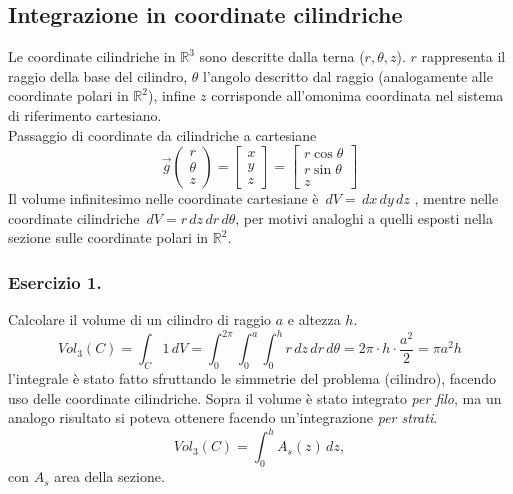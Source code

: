 \documentclass[10pt]{article}
\theoremstyle{plain}
\theoremstyle{definition}
\begin{document}
\subsection{Integrazione in coordinate cilindriche}

Le coordinate cilindriche in $\mathbb{R}^3$ sono descritte dalla terna ($r,\theta,z$). $r$ rappresenta il raggio della base del cilindro, $\theta$ l'angolo descritto dal raggio (analogamente alle coordinate polari in $\mathbb{R}^2$), infine $z$ corrisponde all'omonima coordinata nel sistema di riferimento cartesiano.\\
Passaggio di coordinate da cilindriche a cartesiane
$$\vec{g} \left(\begin{matrix}  r \\ \theta \\ z  \end{matrix}\right) = \begin{bmatrix} x \\ y \\ z \end{bmatrix} = \begin{bmatrix} r \cos\theta \\ r \sin\theta \\ z \end{bmatrix}$$
Il volume infinitesimo nelle coordinate cartesiane è $\,dV = \,dx\,dy\,dz$ , mentre nelle coordinate cilindriche $\,dV = r\,dz\,dr\,d\theta$, per motivi analoghi a quelli esposti nella sezione sulle coordinate polari in $\mathbb{R}^2$.

\subsubsection{Esercizio 1.}
Calcolare il volume di un cilindro di raggio $a$ e altezza $h$.
$$Vol_3(C)=\int_C 1\,dV =\int_0^{2\pi}\int_0^a \int_0^h r\,dz\,dr\,d\theta = 2\pi \cdot h \cdot \frac{a^2}{2} = \pi a^2 h$$
l'integrale è stato fatto sfruttando le simmetrie del problema (cilindro), facendo uso delle coordinate cilindriche. Sopra il volume è stato integrato \textit{per filo}, ma un analogo risultato si poteva ottenere facendo un'integrazione \textit{per strati}.
$$Vol_3(C)=\int_0^h A_s(z)\,dz,$$ con $A_s$ area della sezione.
\end{document}
